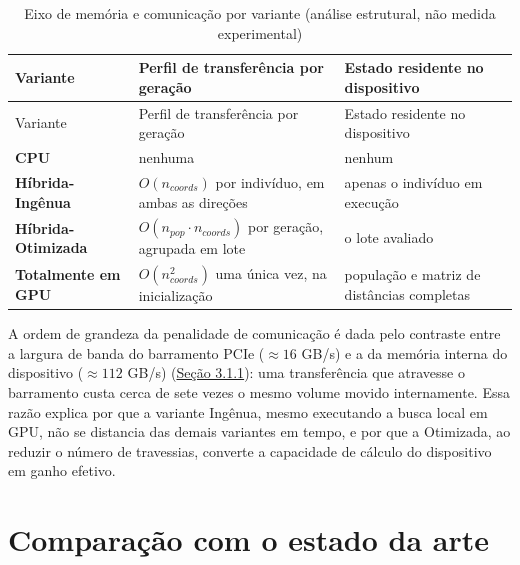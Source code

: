 \begin{longtable}[]{@{}
    >{\raggedright\arraybackslash}p{}
    >{\raggedright\arraybackslash}p{}
    >{\raggedright\arraybackslash}p{}@{}}
  \caption{Eixo de memória e comunicação por variante (análise estrutural,
    não medida experimental)
    \label{tbl:memory-axis}}\tabularnewline
  \toprule\noalign{}
  Variante                   & Perfil de transferência por geração
                             & Estado residente no dispositivo                                                                            \\
  \midrule\noalign{}
  \endfirsthead
  \toprule\noalign{}
  Variante                   & Perfil de transferência por geração
                             & Estado residente no dispositivo                                                                            \\
  \midrule\noalign{}
  \endhead
  \bottomrule\noalign{}
  \endlastfoot
  \textbf{CPU}               & nenhuma                                                       & nenhum                                     \\
  \textbf{Híbrida-Ingênua}   & \(O(n_{coords})\) por indivíduo, em ambas as direções         & apenas o indivíduo em execução             \\
  \textbf{Híbrida-Otimizada} & \(O(n_{pop} \cdot n_{coords})\) por geração, agrupada em lote & o lote avaliado                            \\
  \textbf{Totalmente em GPU} & \(O(n_{coords}^2)\) uma única vez, na inicialização           & população e matriz de distâncias completas \\
\end{longtable}

A ordem de grandeza da penalidade de comunicação é dada pelo contraste entre a largura de banda do barramento PCIe (\(\approx 16\) GB/s) e a da memória interna do dispositivo (\(\approx 112\) GB/s) (\hyperref[sec-311-hardware-software]{Seção 3.1.1}): uma transferência que atravesse o barramento custa cerca de sete vezes o mesmo volume movido internamente.
Essa razão explica por que a variante Ingênua, mesmo executando a busca local em GPU, não se distancia das demais variantes em tempo, e por que a Otimizada, ao reduzir o número de travessias, converte a capacidade de cálculo do dispositivo em ganho efetivo.

\section{Comparação com o estado da arte}\label{sec-52-comparacao-estado-arte}

